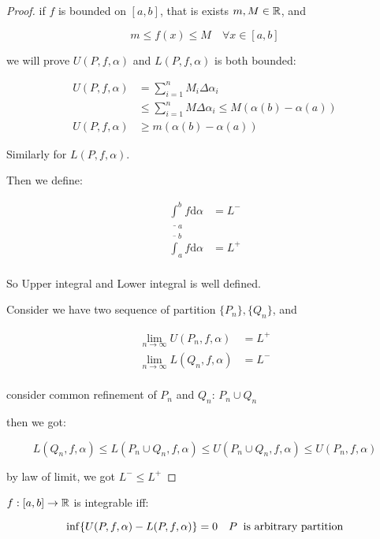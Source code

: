 \begin{proof}
    if $f$ is bounded on $[a,b]$, that is exists $m, M \in \mathbb{R}$, and

    \[
        m \le f(x) \le M \quad \forall x \in [a,b]
    \]

    we will prove $U(P, f, \alpha)$ and $L(P,f, \alpha)$ is both bounded:

    \begin{align*}
        U(P, f, \alpha) &= \sum_{i=1}^{n} M_i \Delta \alpha_i \\
        & \le \sum_{i=1}^{n} M \Delta \alpha_i \le M(\alpha(b)- \alpha(a))\\
        U(P, f, \alpha) & \ge m(\alpha(b)-\alpha(a))
    \end{align*}

    Similarly for $L(P,f, \alpha)$.

    Then we define:

    \begin{align*}
        \underline{\int}_a^b f \mathrm{d} \alpha &= L^- \\
        \overline{\int}_a^b f \mathrm{d} \alpha &= L^+ \\
    \end{align*}

    So Upper integral and Lower integral is well defined.

    Consider we have two sequence of partition $\{ P_n \}, \{ Q_n \}$, and

    \begin{align*}
        \lim_{n \to \infty}U(P_n, f, \alpha) &= L^+ \\
        \lim_{n \to \infty}L(Q_n, f, \alpha) &= L^- \\
    \end{align*}

    consider common refinement of $P_n$ and $Q_n$: $ P_n \cup Q_n$

    then we got:

    \[
        L(Q_n, f, \alpha) \le L(P_n \cup Q_n, f, \alpha) \le U(P_n \cup Q_n, f, \alpha) \le U(P_n, f, \alpha)
    \]

    by law of limit, we got $L^- \le L^+$

\end{proof}

\begin{thm}
    $f: [a,b] \to \mathbb{R}$ is integrable iff:

    \[
        \inf \{ U(P,f, \alpha) - L(P,f,\alpha) \} = 0 \quad P \text{\: is arbitrary partition}
    \]
\end{thm}

